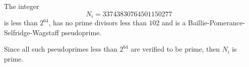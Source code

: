 \documentclass[12pt]{extarticle}
\begin{document}
\newpage

\pagestyle{empty}
\phantom{a}
\vspace{2em}

\begin{center}
{\Huge {}}
\end{center}
\vspace{2em}

\noindent The integer
{\Huge
$$
N_i = 33743830764501150277
$$
}
is less than $2^{64}$, has no prime divisors less than $102$ and is a Baillie-Pomerance-Selfridge-Wagstaff pseudoprime.

\vspace{2em}
\noindent Since all such pseudoprimes less than $2^{64}$ are verified to be prime, then $N_i$ is prime.
\end{document}
